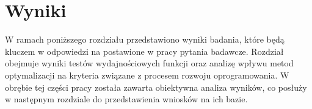 \chapter{Wyniki}\label{chapter:wyniki}

W ramach poniższego rozdziału przedstawiono wyniki badania, które będą kluczem w odpowiedzi na postawione w pracy pytania badawcze.
Rozdział obejmuje wyniki testów wydajnościowych funkcji oraz analizę wpływu metod optymalizacji na kryteria związane z procesem rozwoju oprogramowania.
W obrębie tej części pracy została zawarta obiektywna analiza wyników, co posłuży w następnym rozdziale do przedstawienia wniosków na ich bazie.










